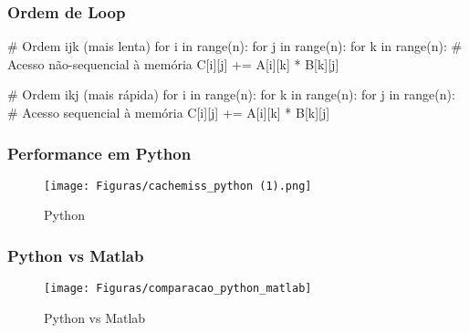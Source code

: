 \documentclass[utf8]{beamer}
\theoremstyle{definition}
\begin{document}
\begin{frame}[fragile]
	\frametitle{Ordem de Loop}
	\begin{semiverbatim}
		# Ordem ijk (mais lenta)
		for i in range(n):
		   for j in range(n):
		      for k in range(n):  # Acesso não-sequencial à memória
		        C[i][j] += A[i][k] * B[k][j]
		
		# Ordem ikj (mais rápida)
		for i in range(n):
		   for k in range(n):
		      for j in range(n):  # Acesso sequencial à memória
		         C[i][j] += A[i][k] * B[k][j]
	\end{semiverbatim}
\end{frame}

\begin{frame}
	\frametitle{Performance em Python}
	\begin{figure}[H]
		\centering
		\texttt{[image: Figuras/cachemiss\_python (1).png]}
		\caption{Python}
		\label{fig:performace_python}
	\end{figure}
\end{frame}

\begin{frame}
		\frametitle{Python vs Matlab}
	\begin{figure}[H]
		\centering
		\texttt{[image: Figuras/comparacao\_python\_matlab]}
		\caption{Python vs Matlab}
		\label{fig:performace_python_vs_matlab}
	\end{figure}
\end{frame}
\end{document}
